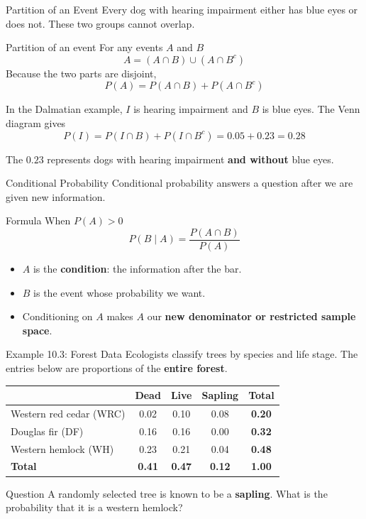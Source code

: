 \documentclass[aspectratio=169]{beamer}
\begin{document}
\begin{frame}{Partition of an Event}
Every dog with hearing impairment either has blue eyes or does not. These two groups cannot overlap.

\begin{block}{Partition of an event}
For any events $A$ and $B$
$$A=(A\cap B)\cup(A\cap B^c)$$
Because the two parts are disjoint,
$$\boxed{P(A)=P(A\cap B)+P(A\cap B^c)}$$
\end{block}

In the Dalmatian example, $I$ is hearing impairment and $B$ is blue eyes. The Venn diagram gives
$$P(I)=P(I\cap B)+P(I\cap B^c) =0.05+0.23 =0.28$$

\small
The $0.23$ represents dogs with hearing impairment \textbf{and without} blue eyes.
\end{frame}

\begin{frame}{Conditional Probability}
Conditional probability answers a question after we are given new information.
\begin{block}{Formula}
When $P(A)>0$
$$P(B\mid A)=\frac{P(A\cap B)}{P(A)}$$
\end{block}

\begin{itemize}
	\item $A$ is the \textbf{condition}: the information after the bar.
  	 \item $B$ is the event whose probability we want.
    	\item Conditioning on $A$ makes $A$ our \textbf{new denominator or restricted sample space}.
\end{itemize}
\end{frame}

\begin{frame}{Example 10.3: Forest Data}
Ecologists classify trees by species and life stage. The entries below are proportions of the \textbf{entire forest}.
\begin{table}
\centering
\small
\begin{tabular}{lcccc}
\toprule
& \textbf{Dead} & \textbf{Live} & \textbf{Sapling} & \textbf{Total} \\
\midrule
Western red cedar (WRC) & 0.02 & 0.10 & 0.08 & \textbf{0.20} \\
Douglas fir (DF) & 0.16 & 0.16 & 0.00 & \textbf{0.32} \\
Western hemlock (WH) & 0.23 & 0.21 & 0.04 & \textbf{0.48} \\
\midrule
\textbf{Total} & \textbf{0.41} & \textbf{0.47} & \textbf{0.12} & \textbf{1.00} \\
\bottomrule
\end{tabular}
\end{table}

\begin{block}{Question}
A randomly selected tree is known to be a \textbf{sapling}. What is the probability that it is a western hemlock?
\end{block}
\end{frame}
\end{document}
